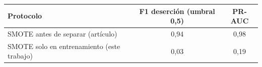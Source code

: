 \begin{tabular}{lcc}
\toprule
Protocolo & F1 deserción (umbral 0,5) & PR-AUC \\
\midrule
SMOTE antes de separar (artículo) & 0{,}94 & 0{,}98 \\
SMOTE solo en entrenamiento (este trabajo) & 0{,}03 & 0{,}19 \\
\bottomrule
\end{tabular}
